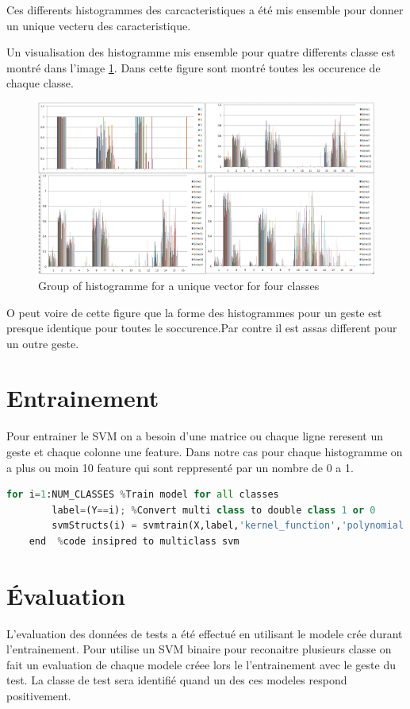 Ces differents histogrammes  des carcacteristiques a été mis ensemble pour donner un unique vecteru des caracteristique. 

Un visualisation des histogramme mis ensemble pour quatre differents classe est montré dans l'image \ref{fig:histvector}. Dans cette figure sont montré toutes les occurence de chaque classe.

\begin{figure}[h]
  \centering
    \includegraphics[width=1\linewidth]{img/extraction/vector-hist.png}
  \caption{Group of histogramme for a unique vector for four classes}
  \label{fig:histvector}
\end{figure}

O peut voire de cette figure que la forme des histogrammes pour un geste est presque identique pour toutes le soccurence.Par contre il est assas different pour un outre geste.

\section*{Entrainement}
Pour entrainer le SVM on a besoin d'une matrice ou chaque ligne reresent un geste et chaque colonne une feature. Dans notre cas pour chaque histogramme on a plus ou moin 10 feature qui sont reppresenté par un nombre de 0 a 1. 

\begin{lstlisting}[language=python]
    for i=1:NUM_CLASSES %Train model for all classes
        label=(Y==i); %Convert multi class to double class 1 or 0
        svmStructs(i) = svmtrain(X,label,'kernel_function','polynomial');
    end  %code insipred to multiclass svm
\end{lstlisting}

\section*{Évaluation}
L'evaluation des données de tests a été effectué en utilisant le modele crée durant l'entrainement. Pour utilise un SVM binaire pour reconaitre plusieurs classe on fait un evaluation de chaque modele créee lors le l'entrainement avec le geste du test. La classe de test sera identifié quand un des ces modeles respond positivement.

